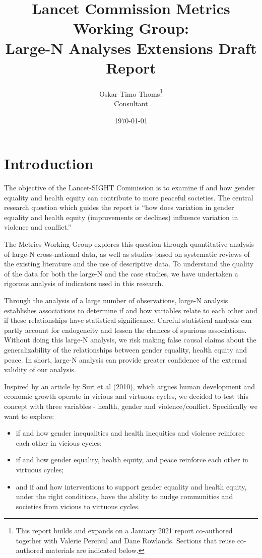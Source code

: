 \documentclass[12pt]{article}
\author{Oskar Timo Thoms\thanks{This report builds and expands on a January 2021 report co-authored together with Valerie Percival and Dane Rowlands. Sections that reuse co-authored materials are indicated below.}\\Consultant}
\title{Lancet Commission Metrics Working Group:\\Large-N Analyses Extensions Draft Report}
\date{\today}
\begin{document}
\maketitle
\tableofcontents

\section{Introduction}


The objective of the Lancet-SIGHT Commission is to examine if and how gender equality and health equity can contribute to more peaceful societies.
The central research question which guides the report is \enquote{how does variation in gender equality and health equity (improvements or declines) influence variation in violence and conflict.}

The Metrics Working Group explores this question through quantitative analysis of large-N cross-national data, as well as studies based on systematic reviews of the existing literature and the use of descriptive data. To understand the quality of the data for both the large-N and the case studies, we have undertaken a rigorous analysis of indicators used in this research.

Through the analysis of a large number of observations, large-N analysis establishes associations to determine if and how variables relate to each other and if these relationships have statistical significance. Careful statistical analysis can partly account for endogeneity and lessen the chances of spurious associations. Without doing this large-N analysis, we risk making false causal claims about the generalizability of the relationships between gender equality, health equity and peace. In short, large-N analysis can provide greater confidence of the external validity of our analysis.

Inspired by an article by Suri et al (2010), which argues human development and economic growth operate in vicious and virtuous cycles, we decided to test this concept with three variables - health, gender and violence/conflict. Specifically we want to explore:
\begin{itemize}
\item if and how gender inequalities and health inequities and violence reinforce each other in vicious cycles;
\item if and how gender equality, health equity, and peace reinforce each other in virtuous cycles;
\item and if and how interventions to support gender equality and health equity, under the right conditions, have the ability to nudge communities and societies from vicious to virtuous cycles.
\end{itemize}
\end{document}
